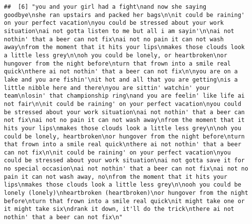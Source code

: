 \documentclass[]{article}
\begin{document}
\begin{verbatim}
##  [6] "you and your girl had a fight\nand now she saying goodbye\nshe ran upstairs and packed her bags\n\nit could be raining' on your perfect vacation\nyou could be stressed about your work situation\nai not gotta listen to me but all i am sayin'\n\nai not nothin' that a beer can not fix\nai not no pain it can not wash away\nfrom the moment that it hits your lips\nmakes those clouds look a little less grey\n\noh you could be lonely, or heartbroken\nor hungover from the night before\nturn that frown into a smile real quick\nthere ai not nothin' that a beer can not fix\n\nyou are on a lake and you are fishin'\nit hot and all that you are getting\nis a little nibble here and there\nyou are sittin' watchin' your team\nlosin' that championship ring\nand you are feelin' like life ai not fair\n\nit could be raining' on your perfect vacation\nyou could be stressed about your work situation\nai not nothin' that a beer can not fix\nai not no pain it can not wash away\nfrom the moment that it hits your lips\nmakes those clouds look a little less grey\n\noh you could be lonely, heartbroken\nor hungover from the night before\nturn that frown into a smile real quick\nthere ai not nothin' that a beer can not fix\n\nit could be raining' on your perfect vacation\nyou could be stressed about your work situation\nai not gotta save it for no special occasion\nai not nothin' that a beer can not fix\nai not no pain it can not wash away, no\nfrom the moment that it hits your lips\nmakes those clouds look a little less grey\n\nooh you could be lonely (lonely)\nheartbroken (heartbroken)\nor hungover from the night before\nturn that frown into a smile real quick\nit might take one or it might take six\ndrank it down, it'll do the trick\nthere ai not nothin' that a beer can not fix\n"                                                                                                                                                                                                                                                                                                                                                                                                                                                                                                                                                                                                                                                                                                                                                                                                                                                                                                                                                                                                                                                                                                                            

\end{verbatim}
\end{document}
